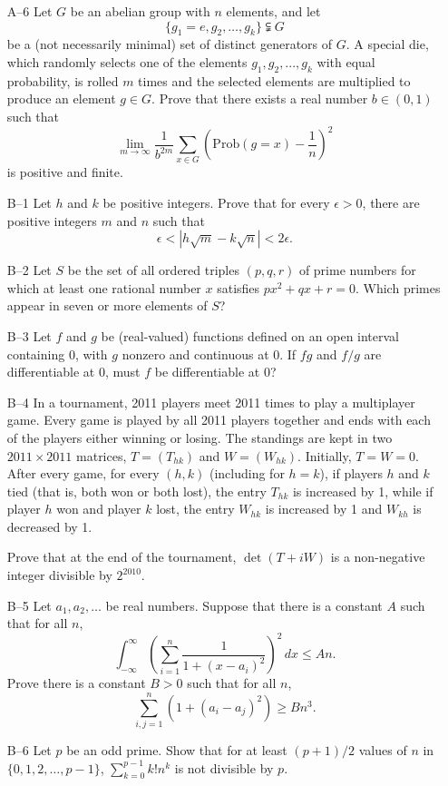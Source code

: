 \documentclass[amssymb,twocolumn,pra,10pt,aps]{revtex4-1}
\begin{document}
\begin{itemize}
\item[A--6] Let $G$ be an abelian group with $n$ elements, and let
\[ \{g_1=e,g_2,\dots,g_k\} \subsetneqq G \]
be a (not necessarily minimal) set of distinct generators of $G$. A special
die, which randomly selects one of the elements $g_1,g_2,...,g_k$ with equal
probability, is rolled $m$ times and the selected elements are multiplied
to produce an element $g \in G$.  Prove that there exists a real number
$b \in (0,1)$ such that
\[ \lim_{m\to\infty} \frac{1}{b^{2m}} \sum_{x\in G} \left(\mathrm{Prob}(g=x)
    - \frac{1}{n}\right)^2 \]
is positive and finite.

\item[B--1] Let $h$ and $k$ be positive integers. Prove that for every
$\epsilon > 0$, there are positive integers $m$ and $n$ such that
\[ \epsilon < |h \sqrt{m} - k \sqrt{n}| < 2\epsilon.  \]

\item[B--2] Let $S$ be the set of all ordered triples $(p,q,r)$ of prime
numbers for which at least one rational number $x$ satisfies $px^2 + qx +
r =0$. Which primes appear in seven or more elements of $S$?

\item[B--3] Let $f$ and $g$ be (real-valued) functions defined on an open
interval containing $0$, with $g$ nonzero and continuous at $0$.  If $fg$
and $f/g$ are differentiable at $0$, must $f$ be differentiable at 0?

\item[B--4] In a tournament, 2011 players meet 2011 times to play a
multiplayer game. Every game is played by all 2011 players together and
ends with each of the players either winning or losing. The standings
are kept in two $2011 \times 2011$ matrices, $T = (T_{hk})$ and $W =
(W_{hk})$. Initially, $T=W=0$. After every game, for every $(h,k)$ (including
for $h=k$), if players $h$ and $k$ tied (that is, both won or both lost),
the entry $T_{hk}$ is increased by 1, while if player $h$ won and player $k$
lost, the entry $W_{hk}$ is increased by 1 and $W_{kh}$ is decreased by 1.

Prove that at the end of the tournament, $\det(T+iW)$ is a non-negative
integer divisible by $2^{2010}$.

\item[B--5] Let $a_1, a_2, \dots$ be real numbers. Suppose that there is
a constant $A$ such that for all $n$,
\[
\int_{-\infty}^\infty \left( \sum_{i=1}^n \frac{1}{1 + (x-a_i)^2} \right)^2\,dx \leq An.
\]
Prove there is a constant $B>0$ such that for all $n$,
\[
\sum_{i,j=1}^n (1 + (a_i - a_j)^2) \geq Bn^3.
\]

\item[B--6]
Let $p$ be an odd prime. Show that for at least $(p+1)/2$ values of $n$ in $\{0,1,2,\dots,p-1\}$,
$\sum_{k=0}^{p-1} k! n^k$
is not divisible by $p$.

\end{itemize}
\end{document}
